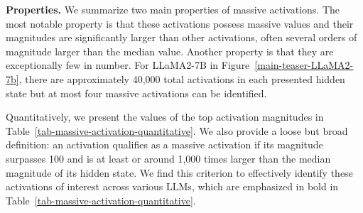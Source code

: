 \documentclass[10pt]{article}
\theoremstyle{definition}
\theoremstyle{plain}
\begin{document}
\textbf{Properties.} We summarize two main properties of massive activations. The most notable property is that these activations possess massive values and their magnitudes are significantly larger than other activations, often several orders of magnitude larger than the median value. Another property is that they are exceptionally few in number. For LLaMA2-7B in Figure~\ref{main-teaser-LLaMA2-7b}, there are approximately 40,000 total activations in each presented hidden state but at most four massive activations can be identified. 

\begin{table}[b!]
\centering
\vspace{-1ex}
\renewcommand{\arraystretch}{1.0}
\vspace{-1ex}
\caption{Five largest, top 1$\%$ and 10$\%$, and the median \textit{activation magnitudes} at a hidden state of three LLMs. The activations that are considered as massive activations are highlighted in bold.
}
\label{tab-massive-activation-quantitative}
\end{table}

Quantitatively, we present the values of the top activation magnitudes in Table~\ref{tab-massive-activation-quantitative}. We also provide a loose but broad definition: an activation qualifies as a massive activation if its magnitude surpasses 100 and is at least or around 1,000 times larger than the median magnitude of its hidden state. We find this criterion to effectively identify these activations of interest across various LLMs, which are emphasized in bold in Table~\ref{tab-massive-activation-quantitative}.
\end{document}
